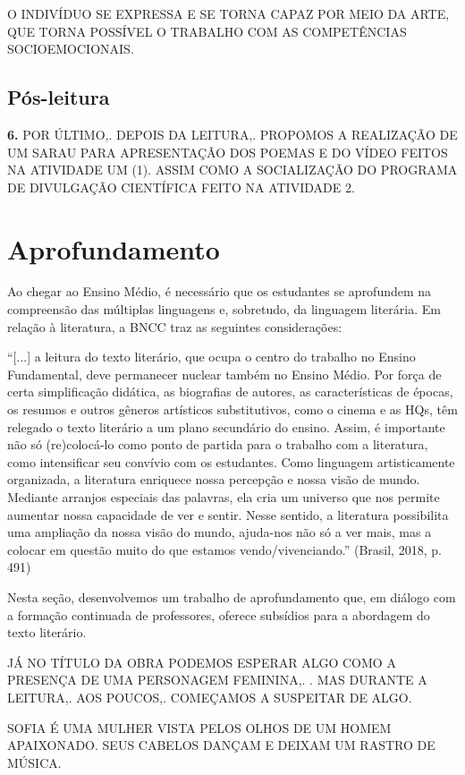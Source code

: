 \documentclass{extarticle}
\begin{document}
O INDIVÍDUO SE EXPRESSA E SE TORNA CAPAZ POR MEIO DA ARTE, QUE TORNA
POSSÍVEL O TRABALHO COM AS COMPETÊNCIAS SOCIOEMOCIONAIS.

\subsection{Pós-leitura}

\textbf{6.} POR ÚLTIMO,. DEPOIS DA LEITURA,. PROPOMOS A REALIZAÇÃO DE UM
SARAU PARA APRESENTAÇÃO DOS POEMAS E DO VÍDEO FEITOS NA ATIVIDADE UM
(1). ASSIM COMO A SOCIALIZAÇÃO DO PROGRAMA DE DIVULGAÇÃO CIENTÍFICA
FEITO NA ATIVIDADE 2.

\section{Aprofundamento}


Ao chegar ao Ensino Médio, é necessário que os estudantes se aprofundem
na compreensão das múltiplas linguagens e, sobretudo, da linguagem
literária. Em relação à literatura, a BNCC traz as seguintes
considerações:

``{[}...{]} a leitura do texto literário, que ocupa o centro do trabalho
no Ensino Fundamental, deve permanecer nuclear também no Ensino Médio.
Por força de certa simplificação didática, as biografias de autores, as
características de épocas, os resumos e outros gêneros artísticos
substitutivos, como o cinema e as HQs, têm relegado o texto literário a
um plano secundário do ensino. Assim, é importante não só (re)colocá-lo
como ponto de partida para o trabalho com a literatura, como
intensificar seu convívio com os estudantes. Como linguagem
artisticamente organizada, a literatura enriquece nossa percepção e
nossa visão de mundo. Mediante arranjos especiais das palavras, ela cria
um universo que nos permite aumentar nossa capacidade de ver e sentir.
Nesse sentido, a literatura possibilita uma ampliação da nossa visão do
mundo, ajuda-nos não só a ver mais, mas a colocar em questão muito do
que estamos vendo/vivenciando.'' (Brasil, 2018, p. 491)

Nesta seção, desenvolvemos um trabalho de aprofundamento que, em diálogo
com a formação continuada de professores, oferece subsídios para a
abordagem do texto literário.

JÁ NO TÍTULO DA OBRA PODEMOS ESPERAR ALGO COMO A PRESENÇA DE UMA
PERSONAGEM FEMININA,. . MAS DURANTE A LEITURA,. AOS POUCOS,. COMEÇAMOS A
SUSPEITAR DE ALGO.


SOFIA É UMA MULHER VISTA PELOS OLHOS DE UM HOMEM APAIXONADO. SEUS
CABELOS DANÇAM E DEIXAM UM RASTRO DE MÚSICA.
 
\end{document}

